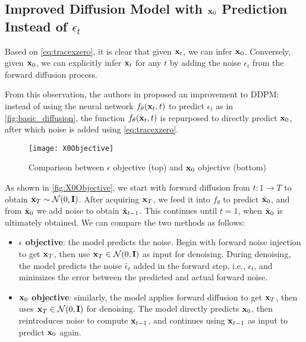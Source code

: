 \subsection{Improved Diffusion Model with $\mathbf{x}_0$ Prediction Instead of $\epsilon_t$}
\label{subsec:X0Objective}

Based on \autoref{eq:tracexzero}, it is clear that given $\mathbf{x}_t$, we can infer $\mathbf{x}_0$. Conversely, given $\mathbf{x}_0$, we can explicitly infer $\mathbf{x}_t$ for any $t$ by adding the noise $\epsilon_t$ from the forward diffusion process.

From this observation, the authors in \cite{nichol2021improved} proposed an improvement to DDPM: instead of using the neural network $f_{\theta}(\mathbf{x}_t, t)$ to predict $\epsilon_t$ as in \autoref{fig:basic_diffusion}, the function $f_{\theta}(\mathbf{x}_t, t)$ is repurposed to directly predict $\mathbf{x}_0$, after which noise is added using \autoref{eq:tracexzero}.

\begin{figure}[H]
	\captionsetup{skip=2pt}
	\texttt{[image: X0Objective]}
	\caption{Comparison between $\epsilon$ objective (top) and $\mathbf{x}_0$ objective (bottom)}
	\label{fig:X0Objective}
\end{figure}

As shown in \autoref{fig:X0Objective}, we start with forward diffusion from $t: 1 \rightarrow T$ to obtain $\mathbf{x}_T \sim \mathcal{N} (0, \mathbf{I})$. After acquiring $\mathbf{x}_T$, we feed it into $f_{\theta}$ to predict $\hat{\mathbf{x}}_0$, and from $\hat{\mathbf{x}}_0$ we add noise to obtain $\hat{\mathbf{x}}_{t-1}$. This continues until $t = 1$, when $\hat{\mathbf{x}}_0$ is ultimately obtained. We can compare the two methods as follows:

\begin{itemize}
	\item \textbf{$\epsilon$ objective}: the model predicts the noise. Begin with forward noise injection to get $\mathbf{x}_T$, then use $\mathbf{x}_T \in \mathcal{N}(0, \mathbf{I})$ as input for denoising. During denoising, the model predicts the noise $\hat{\epsilon}_t$ added in the forward step, i.e., $\epsilon_t$, and minimizes the error between the predicted and actual forward noise.
	\item \textbf{$\mathbf{x}_0$ objective}: similarly, the model applies forward diffusion to get $\mathbf{x}_T$, then uses $\mathbf{x}_T \in \mathcal{N}(0, \mathbf{I})$ for denoising. The model directly predicts $\mathbf{x}_0$, then reintroduces noise to compute $\mathbf{x}_{t-1}$, and continues using $\mathbf{x}_{t-1}$ as input to predict $\mathbf{x}_0$ again.
\end{itemize}

